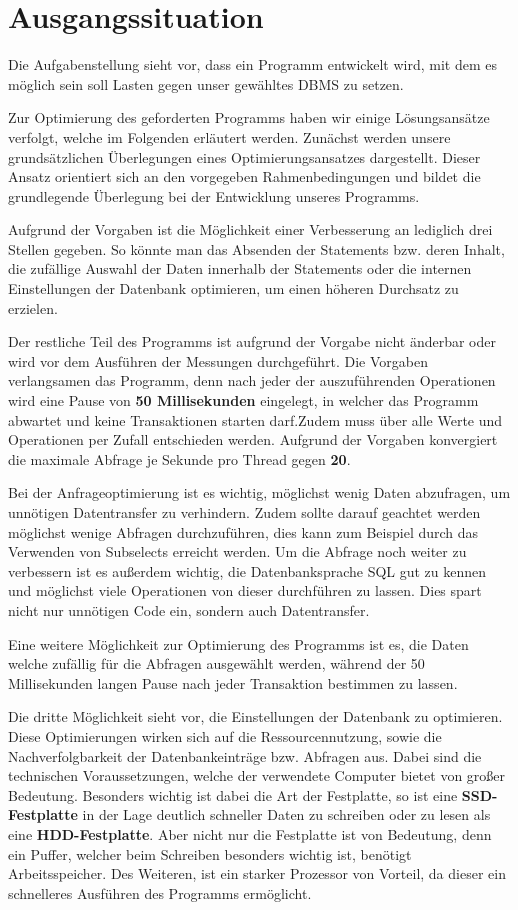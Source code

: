 \section{Ausgangssituation}
Die Aufgabenstellung sieht vor, dass ein Programm entwickelt wird, mit dem es
möglich sein soll Lasten gegen unser gewähltes DBMS zu setzen. 

Zur Optimierung des geforderten Programms haben wir einige Lösungsansätze
verfolgt, welche im Folgenden erläutert werden. Zunächst werden unsere
grundsätzlichen Überlegungen eines Optimierungsansatzes dargestellt. Dieser
Ansatz orientiert sich an den vorgegeben Rahmenbedingungen und bildet die
grundlegende Überlegung bei der Entwicklung unseres Programms.

Aufgrund der Vorgaben ist die Möglichkeit einer Verbesserung an lediglich drei
Stellen gegeben. So könnte man das Absenden der Statements bzw. deren Inhalt,
die zufällige Auswahl der Daten innerhalb der Statements oder die internen
Einstellungen der Datenbank optimieren, um einen höheren Durchsatz zu erzielen.

Der restliche Teil des Programms ist aufgrund der Vorgabe nicht änderbar oder
wird vor dem Ausführen der Messungen durchgeführt. Die Vorgaben verlangsamen
das Programm, denn nach jeder der auszuführenden Operationen wird eine Pause
von \textbf{50 Millisekunden} eingelegt, in welcher das Programm abwartet und
keine Transaktionen starten darf.Zudem muss über alle Werte und Operationen per
Zufall entschieden werden. Aufgrund der Vorgaben konvergiert die maximale
Abfrage je Sekunde pro Thread gegen \textbf{20}.

Bei der Anfrageoptimierung ist es wichtig, möglichst wenig Daten abzufragen, um
unnötigen Datentransfer zu verhindern. Zudem sollte darauf geachtet werden
möglichst wenige Abfragen durchzuführen, dies kann zum Beispiel durch das
Verwenden von Subselects erreicht werden. Um die Abfrage noch weiter zu
verbessern ist es außerdem wichtig, die Datenbanksprache SQL gut zu kennen und
möglichst viele Operationen von dieser durchführen zu lassen. Dies spart nicht
nur unnötigen Code ein, sondern auch Datentransfer.

Eine weitere Möglichkeit zur Optimierung des Programms ist es, die Daten welche
zufällig für die Abfragen ausgewählt werden, während der 50 Millisekunden
langen Pause nach jeder Transaktion bestimmen zu lassen. 

Die dritte Möglichkeit sieht vor, die Einstellungen der Datenbank zu optimieren.
Diese Optimierungen wirken sich auf die Ressourcennutzung, sowie die
Nachverfolgbarkeit der Datenbankeinträge bzw. Abfragen aus. Dabei sind die
technischen Voraussetzungen, welche der verwendete Computer bietet von großer
Bedeutung. Besonders wichtig ist dabei die Art der Festplatte, so ist eine
\textbf{SSD-Festplatte} in der Lage deutlich schneller Daten zu schreiben oder
zu lesen als eine \textbf {HDD-Festplatte}. Aber nicht nur die Festplatte ist von
Bedeutung, denn ein Puffer, welcher beim Schreiben besonders wichtig ist, benötigt
Arbeitsspeicher. Des Weiteren, ist ein starker Prozessor von Vorteil, da dieser
ein schnelleres Ausführen des Programms ermöglicht.

\clearpage